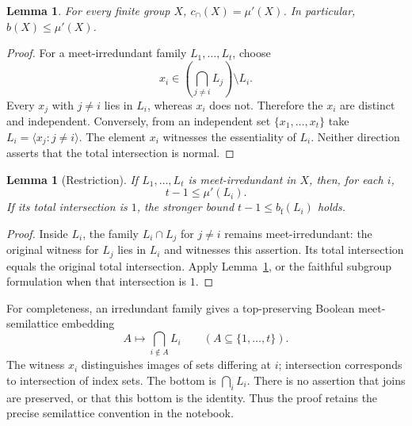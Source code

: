 \documentclass[11pt]{article}
\newtheorem{lemma}[theorem]{Lemma}
\theoremstyle{remark}\newtheorem{remark}[theorem]{Remark}
\newcommand{\mup}{\mu'}
\newcommand{\bfth}{b_{\mathrm f}}
\newcommand{\rankcap}{c_{\cap}}
\begin{document}
\begin{lemma}\label{lem:breadth}
For every finite group $X$, $\rankcap(X)=\mup(X)$. In particular,
$b(X)\le\mup(X)$.
\end{lemma}
\begin{proof}
For a meet-irredundant family $L_1,\ldots,L_t$, choose
\[
 x_i\in\left(\bigcap_{j\ne i}L_j\right)\setminus L_i.
\]
Every $x_j$ with $j\ne i$ lies in $L_i$, whereas $x_i$ does not. Therefore the
$x_i$ are distinct and independent. Conversely, from an independent set
$\{x_1,\ldots,x_t\}$ take $L_i=\langle x_j:j\ne i\rangle$. The element $x_i$
witnesses the essentiality of $L_i$. Neither direction asserts that the total
intersection is normal.
\end{proof}

\begin{lemma}[Restriction]\label{lem:restriction}
If $L_1,\ldots,L_t$ is meet-irredundant in $X$, then, for each $i$,
\[
 t-1\le\mup(L_i).
\]
If its total intersection is $1$, the stronger bound
$t-1\le\bfth(L_i)$ holds.
\end{lemma}
\begin{proof}
Inside $L_i$, the family $L_i\cap L_j$ for $j\ne i$ remains meet-irredundant:
the original witness for $L_j$ lies in $L_i$ and witnesses this assertion.
Its total intersection equals the original total intersection. Apply
Lemma~\ref{lem:breadth}, or the faithful subgroup formulation when that
intersection is $1$.
\end{proof}

For completeness, an irredundant family gives a top-preserving Boolean
meet-semilattice embedding
\[
 A\longmapsto\bigcap_{i\notin A}L_i\qquad(A\subseteq\{1,\ldots,t\}).
\]
The witness $x_i$ distinguishes images of sets differing at $i$; intersection
corresponds to intersection of index sets. The bottom is $\bigcap_iL_i$.
There is no assertion that joins are preserved, or that this bottom is the
identity. Thus the proof retains the precise semilattice convention in the
notebook.
\end{document}
